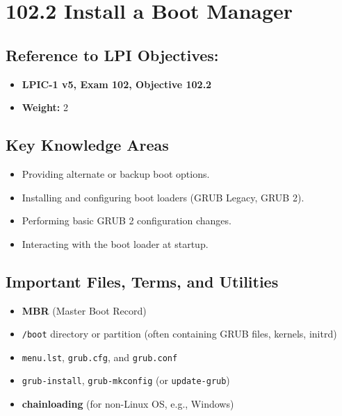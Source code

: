 \documentclass[a4paper]{report}
\begin{document}

\newpage

\section*{102.2 Install a Boot Manager}

\subsection*{Reference to LPI Objectives:}
\begin{itemize}
    \item \textbf{LPIC-1 v5, Exam 102, Objective 102.2}
    \item \textbf{Weight:} 2
\end{itemize}

\subsection*{Key Knowledge Areas}
\begin{itemize}
    \item Providing alternate or backup boot options.
    \item Installing and configuring boot loaders (GRUB Legacy, GRUB 2).
    \item Performing basic GRUB 2 configuration changes.
    \item Interacting with the boot loader at startup.
\end{itemize}

\subsection*{Important Files, Terms, and Utilities}
\begin{itemize}
    \item \textbf{MBR} (Master Boot Record)
    \item \texttt{/boot} directory or partition (often containing GRUB files, kernels, initrd)
    \item \texttt{menu.lst}, \texttt{grub.cfg}, and \texttt{grub.conf}
    \item \texttt{grub-install}, \texttt{grub-mkconfig} (or \texttt{update-grub})
    \item \textbf{chainloading} (for non-Linux OS, e.g., Windows)
\end{itemize}
\end{document}
